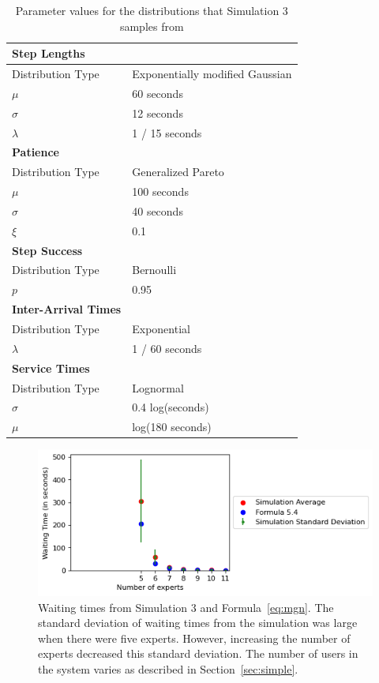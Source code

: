 \begin{table}
  \begin{tabular}{|l|l|}
    \hline
    \textbf{Step Lengths} & \\
    \hline
    Distribution Type & Exponentially modified Gaussian\\
    \hline
    $\mu$ & 60 seconds\\
    \hline
    $\sigma$ & 12 seconds\\
    \hline
    $\lambda$ & 1 / 15 seconds\\
    \hline
    \hline
    \textbf{Patience} & \\
    \hline
    Distribution Type & Generalized Pareto\\
    \hline
    $\mu$ & 100 seconds\\
    \hline
    $\sigma$ & 40 seconds\\
    \hline
    $\xi$ & 0.1\\
    \hline
    \hline
    \textbf{Step Success} & \\
    \hline
    Distribution Type & Bernoulli\\
    \hline
    $p$ & 0.95\\
    \hline
    \hline
    \textbf{Inter-Arrival Times} & \\
    \hline
    Distribution Type & Exponential\\
    \hline
    $\lambda$ & 1 / 60 seconds\\
    \hline
    \hline
    \textbf{Service Times} & \\
    \hline
    Distribution Type & Lognormal\\
    \hline
    $\sigma$ & 0.4 log(seconds)\\
    \hline
    $\mu$ & log(180 seconds)\\
    \hline
  \end{tabular}
  \caption{
    Parameter values for the distributions that Simulation 3 samples from
  }\label{tab:sim3_params}
\end{table}

\begin{figure}[h]
  \includegraphics{figures/montecarlo/full_expected_sim.png}
  \caption[Waiting times from Simulation 3 and Formula~\ref{eq:mgn}]{
    Waiting times from Simulation 3 and Formula~\ref{eq:mgn}.
    The standard deviation of waiting times from the simulation was large when
    there were five experts.
    However, increasing the number of experts decreased this standard deviation.
    The number of users in the system varies as described in
    Section~\ref{sec:simple}.
  }\label{fig:full_expected_sim}
\end{figure}

